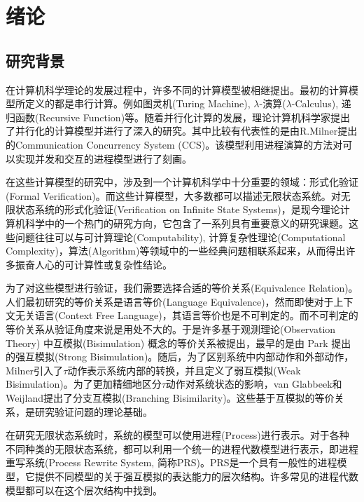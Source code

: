 
\chapter{绪论}
\label{chap:intro}

\section{研究背景}
\label{sec:background}

在计算机科学理论的发展过程中，许多不同的计算模型被相继提出。最初的计算模型所定义的都是串行计算。例如图灵机(Turing Machine)\cite{Turing1936}, $\lambda$-演算($\lambda$-Calculus)\cite{Church1985}, 递归函数(Recursive Function)\cite{Rogers1967}等。随着并行化计算的发展，理论计算机科学家提出了并行化的计算模型并进行了深入的研究。其中比较有代表性的是由R.Milner提出的Communication Concurrency System (CCS)\cite{Milner1989}。该模型利用进程演算的方法对可以实现并发和交互的进程模型进行了刻画。

在这些计算模型的研究中，涉及到一个计算机科学中十分重要的领域：形式化验证(Formal Verification)。而这些计算模型，大多数都可以描述无限状态系统。对无限状态系统的形式化验证(Verification on Infinite State Systems)，是现今理论计算机科学中的一个热门的研究方向，它包含了一系列具有重要意义的研究课题。这些问题往往可以与可计算理论(Computability), 计算复杂性理论(Computational Complexity)，算法(Algorithm)等领域中的一些经典问题相联系起来，从而得出许多振奋人心的可计算性或复杂性结论。

为了对这些模型进行验证，我们需要选择合适的等价关系(Equivalence Relation)。人们最初研究的等价关系是语言等价(Language Equivalence)，然而即使对于上下文无关语言(Context Free Language)，其语言等价也是不可判定的\cite{Hopcroft1979}。而不可判定的等价关系从验证角度来说是用处不大的。于是许多基于观测理论(Observation Theory) 中互模拟(Bisimulation) 概念的等价关系被提出，最早的是由 Park 提出的强互模拟(Strong Bisimulation)\cite{Park1981}。随后，为了区别系统中内部动作和外部动作，Milner引入了$\tau$动作表示系统内部的转换，并且定义了弱互模拟(Weak Bisimulation)\cite{Milner1989}。为了更加精细地区分$\tau$动作对系统状态的影响，van Glabbeek和 Weijland提出了分支互模拟(Branching Bisimilarity)\cite{Glabbeek1996}。这些基于互模拟的等价关系，是研究验证问题的理论基础。

在研究无限状态系统时，系统的模型可以使用进程(Process)进行表示。对于各种不同种类的无限状态系统，都可以利用一个统一的进程代数模型进行表示，即进程重写系统(Process Rewrite System, 简称PRS)\cite{Mayr2000}。PRS是一个具有一般性的进程模型，它提供不同模型的关于强互模拟的表达能力的层次结构。许多常见的进程代数模型都可以在这个层次结构中找到。

